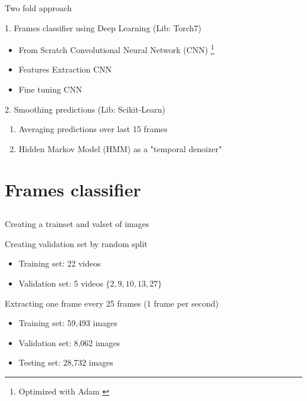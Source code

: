 \begin{frame}{Two fold approach}

	\begin{block}{1. Frames classifier using Deep Learning (Lib: Torch7)}
	\begin{itemize}
		\item From Scratch Convolutional Neural Network (CNN) \footnote{Optimized with Adam \cite{Kingma14}}
		\item Features Extraction CNN \footnotemark[1]
		\item Fine tuning CNN \footnotemark[1]
	\end{itemize}
	\end{block}
	
	\begin{block}{2. Smoothing predictions (Lib: Scikit-Learn)}
	\begin{enumerate}	
		\item Averaging predictions over last 15 frames %
		\item Hidden Markov Model (HMM) as a "temporal denoizer" 
	\end{enumerate}
	\end{block}
	
		
	
\end{frame}


\section{Frames classifier} \subsection{}\label{}

\begin{frame}{Creating a trainset and valset of images}

	\begin{block}{Creating validation set by random split}
	\begin{itemize}
		\item Training set: 22 videos
		\item Validation set: 5 videos $\{2,9,10,13,27\}$
	\end{itemize}
	\end{block}	
	
	\begin{block}{Extracting one frame every 25 frames (1 frame per second)}
	\begin{itemize}
		\item Training set: 59,493 images
		\item Validation set: 8,062 images
		\item Testing set: 28,732 images
	\end{itemize}
	\end{block}
	

\end{frame}

